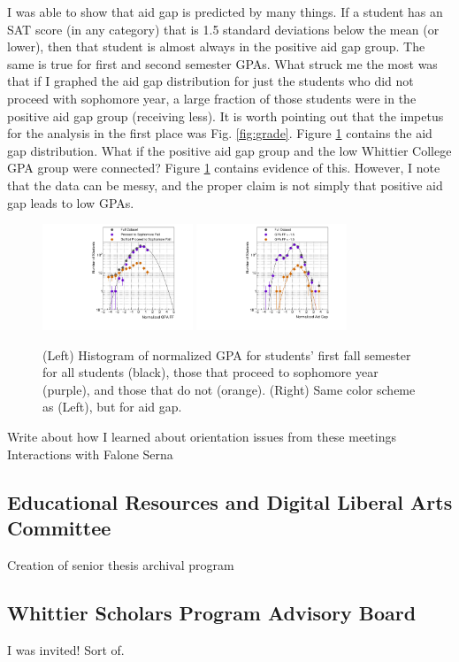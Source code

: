 \documentclass[../../../main.tex]{subfiles}
\begin{document}
I was able to show that aid gap is predicted by many things.  If a student has an SAT score (in any category) that is 1.5 standard deviations below the mean (or lower), then that student is almost always in the positive aid gap group.  The same is true for first and second semester GPAs.  What struck me the most was that if I graphed the aid gap distribution for just the students who did not proceed with sophomore year, a large fraction of those students were in the positive aid gap group (receiving less).  It is worth pointing out that the impetus for the analysis in the first place was Fig. \ref{fig:grade}.  Figure \ref{fig:grade2} contains the aid gap distribution.  What if the positive aid gap group and the low Whittier College GPA group were connected?  Figure \ref{fig:grade2} contains evidence of this.  However, I note that the data can be messy, and the proper claim is not simply that positive aid gap leads to low GPAs.

\begin{figure}
\centering
\includegraphics[width=0.4\textwidth]{figures/Dec5_plot6.pdf}
\includegraphics[width=0.4\textwidth]{figures/Dec4_plot5.pdf}
\caption{\label{fig:grade2} (Left) Histogram of normalized GPA for students' first fall semester for all students (black), those that proceed to sophomore year (purple), and those that do not (orange).  (Right) Same color scheme as (Left), but for aid gap.}
\end{figure}

Write about how I learned about orientation issues from these meetings Interactions with Falone Serna

\subsection{Educational Resources and Digital Liberal Arts Committee}

Creation of senior thesis archival program

\subsection{Whittier Scholars Program Advisory Board}

I was invited!  Sort of.
\end{document}

